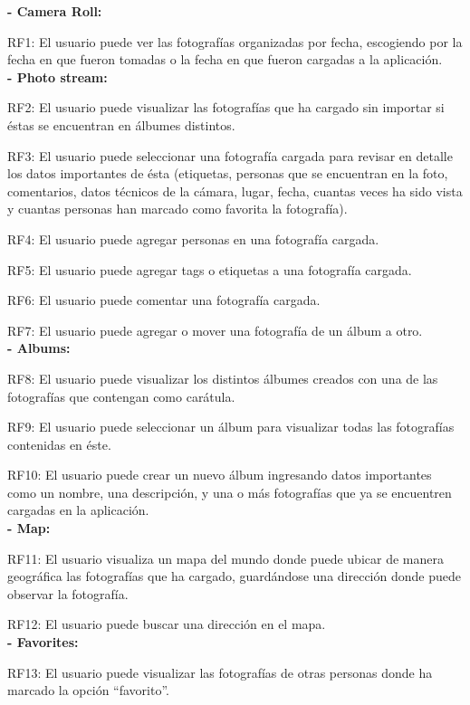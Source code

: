 \documentclass{memoria}
\begin{document}
\textbf{- Camera Roll:}

RF1: El usuario puede ver las fotografías organizadas por fecha, escogiendo por la fecha en que fueron tomadas o la fecha en que fueron cargadas a la aplicación.\\

\textbf{- Photo stream:}

RF2: El usuario puede visualizar las fotografías que ha cargado sin importar si éstas se encuentran en álbumes distintos.

RF3: El usuario puede seleccionar una fotografía cargada para revisar en detalle los datos importantes de ésta (etiquetas, personas que se encuentran en la foto, comentarios, datos técnicos de la cámara, lugar, fecha, cuantas veces ha sido vista y cuantas personas han marcado como favorita la fotografía).

RF4: El usuario puede agregar personas en una fotografía cargada.

RF5: El usuario puede agregar tags o etiquetas a una fotografía cargada.

RF6: El usuario puede comentar una fotografía cargada.

RF7: El usuario puede agregar o mover una fotografía de un álbum a otro.\\

\textbf{- Albums:}

RF8: El usuario puede visualizar los distintos álbumes creados con una de las fotografías que contengan como carátula.

RF9: El usuario puede seleccionar un álbum para visualizar todas las fotografías contenidas en éste.

RF10: El usuario puede crear un nuevo álbum ingresando datos importantes como un nombre, una descripción, y una o más fotografías que ya se encuentren cargadas en la aplicación. \\

\textbf{- Map:}

RF11: El usuario visualiza un mapa del mundo donde puede ubicar de manera geográfica las fotografías que ha cargado, guardándose una dirección donde puede observar la fotografía. 

RF12: El usuario puede buscar una dirección en el mapa. \\

\textbf{- Favorites:}

RF13: El usuario puede visualizar las fotografías de otras personas donde ha marcado la opción “favorito”.\\\\\\
\end{document}
